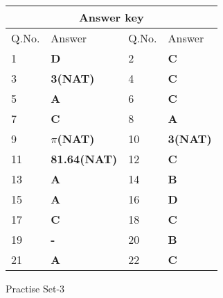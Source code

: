 \begin{table}[H]
	\centering
	\begin{tabular}{|p{1.5cm}|p{1.7cm}||p{1.5cm}|p{1.5cm}|}
		\hline
		\multicolumn{4}{|c|}{\textbf{Answer key}}\\\hline\hline
		\rowcolor{ocrel}Q.No.&Answer&Q.No.&Answer\\\hline
		1&\textbf{D} &2&\textbf{C}\\\hline 
		3&\textbf{3(NAT)} &4&\textbf{C} \\\hline
		5&\textbf{A} &6&\textbf{C} \\\hline
		7&\textbf{C}&8&\textbf{A}\\\hline
		9&\textbf{$\pi$(NAT)}&10&\textbf{3(NAT)}\\\hline
		11&\textbf{81.64(NAT)} &12&\textbf{C}\\\hline
		13&\textbf{A}& 14&\textbf{B}\\\hline
		15&\textbf{A}&16 &\textbf{D}\\\hline
		17&\textbf{C}&18&\textbf{C}\\\hline
		19&\textbf{-} &20&\textbf{B}\\\hline
		21&\textbf{A}&22&\textbf{C}\\\hline
	\end{tabular}
\end{table}
\newpage
\begin{abox}
	Practise Set-3
\end{abox}
